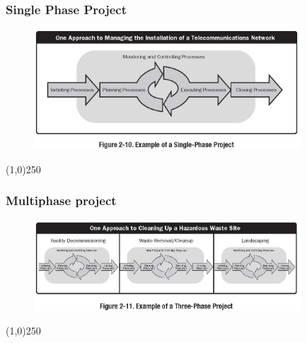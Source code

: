 \begin{frame}
\frametitle{Single Phase Project}
 \begin{figure}
 	\centering
 		\includegraphics[width = 10cm]{images/Fig2-10.jpg}
 	\label{fig:2-10}
 \end{figure}
\end{frame}
\begin{center}\line(1,0){250}\end{center}



\begin{frame}
\frametitle{Multiphase project}
 \begin{figure}
 	\centering
 		\includegraphics[width = 10cm]{images/Fig2-11.jpg}
 	\label{fig:2-11}
 \end{figure}
\end{frame}
\begin{center}\line(1,0){250}\end{center}



